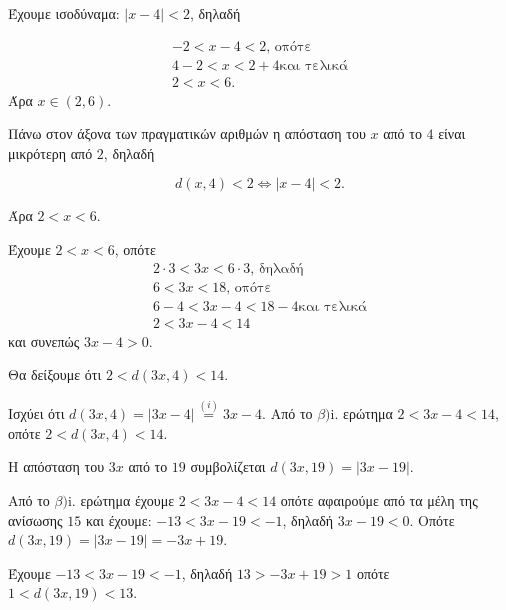 
\begin{alist}
\item Έχουμε ισοδύναμα:
$|x - 4| < 2$, δηλαδή

\begin{gather*}
-2 < x - 4 < 2\text{, οπότε} \\
4 - 2 < x < 2 + 4\text{και τελικά} \\
2 < x < 6.
\end{gather*}
Άρα $x \in (2, 6)$.

\item Πάνω στον άξονα των πραγματικών αριθμών η απόσταση του $x$ από το $4$ είναι μικρότερη
από $2$, δηλαδή

\[d(x, 4) < 2 \Leftrightarrow |x - 4| < 2.\]

Άρα $2 < x < 6$.
\begin{rlist}
\item Έχουμε $2 < x < 6$, οπότε
\begin{gather*}
2 \cdot 3 < 3x < 6 \cdot 3\text{, δηλαδή} \\
6 < 3x < 18\text{, οπότε} \\
6 - 4 < 3x - 4 < 18 - 4\text{και τελικά} \\
2 < 3x - 4 < 14
\end{gather*}
και συνεπώς $3x - 4 > 0$.

\item Θα δείξουμε ότι $2 < d(3x, 4) < 14$.

Ισχύει ότι $d(3x, 4) = |3x - 4| \stackrel{(i)}{=} 3x - 4$. Από το $\beta)\text{i.}$ ερώτημα $2 < 3x - 4 < 14$, οπότε
$2 < d(3x, 4) < 14$.

\item Η απόσταση του $3x$ από το $19$ συμβολίζεται $d(3x, 19) = |3x - 19|$.

Από το $\beta)\text{i.}$ ερώτημα έχουμε $2 < 3x - 4 < 14$ οπότε αφαιρούμε από τα μέλη της ανίσωσης
$15$ και έχουμε:
$-13 < 3x - 19 < -1$, δηλαδή $3x - 19 < 0$. Οπότε $d(3x, 19) = |3x - 19| = -3x + 19$.

Έχουμε $-13 < 3x - 19 < -1$, δηλαδή
$13 > -3x + 19 > 1$ οπότε $1 < d(3x, 19) < 13$.
\end{rlist}
\end{alist}

